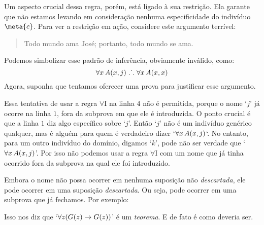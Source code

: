  
Um aspecto crucial dessa regra, porém, está ligado à sua restrição. Ela garante que não estamos levando em consideração nenhuma especificidade do indivíduo $\meta{c}$.
 Para ver a restrição em ação, considere este argumento terrível:
	\begin{quote}
		Todo mundo ama José; portanto, todo mundo se ama.
	\end{quote}
Podemos simbolizar esse padrão de inferência, obviamente inválido, como:
$$\forall x\,\mathord{A}(x,j) \mathrel{\ldotp\dot{}\,\ldotp} \forall x\,\mathord{A}(x,x)$$
Agora, suponha que tentamos oferecer uma prova para  justificar esse argumento.
\begin{fitchproof}
	\open
	 
	\close
	 
\end{fitchproof}\noindent

Essa tentativa de usar a regra $\forall$I na linha $4$ não é permitida, porque o nome `$j$' 
já ocorre na linha $1$, fora da subprova em que ele é introduzida. O ponto crucial é que a linha $1$ diz algo específico sobre `$j$'. Então `$j$' não é um indivíduo genérico qualquer, mas é alguém para quem é verdadeiro dizer  `$\forall x\, \mathord{A}(x,j)$`. No entanto, para um outro indivíduo do domínio, digamos `$k$', pode não ser verdade que `$\forall x\, \mathord{A}(x,j)$'. Por isso não podemos usar a regra $\forall$I com um nome que já tinha ocorrido fora da subprova na qual ele foi introduzido.

Embora o nome  não possa ocorrer em nenhuma suposição não \emph{descartada}, ele pode ocorrer em uma suposição \emph{descartada}. Ou seja, pode ocorrer em uma subprova que já fechamos. Por exemplo:

\begin{fitchproof}
	\open
	\close
\end{fitchproof}
Isso nos diz que `$\forall z (\mathord{G}(z) \rightarrow \mathord{G}(z))$' é um \emph{teorema}. E de fato é como deveria ser.

